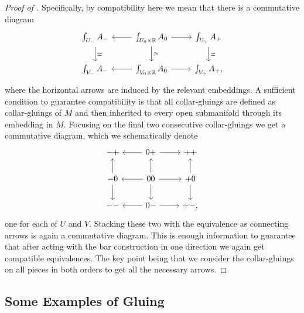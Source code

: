 \documentclass[../text]{subfiles}
\begin{document}
\begin{proof}[Proof of ]
    Specifically, by compatibility here we mean that there is a commutative diagram
    \begin{equation}\label{cd:equivs_from_lc}
        \begin{tikzcd}
            \int_{U_-} A_- \arrow[d, "\simeq"] & \int_{U_0 \times \mathbb{R}} A_0 \arrow[d, "\simeq"] \arrow[l] \arrow[r] & \int_{U_+} A_+ \arrow[d, "\simeq"] \\
            \int_{V_-} A_- & \int_{V_0 \times \mathbb{R}} A_0 \arrow[l] \arrow[r] & \int_{V_+} A_+,
        \end{tikzcd}
    \end{equation}
    where the horizontal arrows are induced by the relevant embeddings. A sufficient condition to guarantee compatibility is that all collar-gluings are defined as collar-gluings of $M$ and then inherited to every open submanifold through its embedding in $M$. Focusing on the final two consecutive collar-gluings we get a commutative diagram, which we schematically denote
    \begin{equation}
        \begin{tikzcd}
            -+ & 0+ \arrow[l] \arrow[r] & ++\\
            -0 \arrow[u] \arrow[d] & 00 \arrow[u] \arrow[l] \arrow[r] \arrow[d] & +0 \arrow[d] \arrow[u] \\
            -- & 0- \arrow[l] \arrow[r] & +-,
        \end{tikzcd}
    \end{equation}
    one for each of $U$ and $V$. Stacking these two with the equivalence as connecting arrows is again a commutative diagram. This is enough information to guarantee that after acting with the bar construction in one direction we again get compatible equivalences. The key point being that we consider the collar-gluings on all pieces in both orders to get all the necessary arrows.
\end{proof}


\subsection{Some Examples of Gluing}
\end{document}
